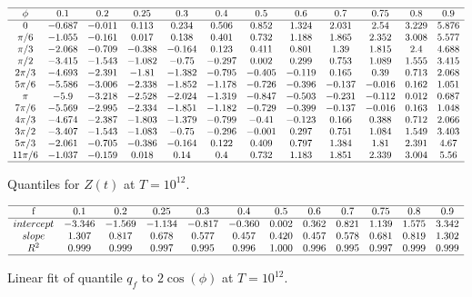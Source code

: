 \documentclass[twoside]{article}
\begin{document}
\begin{table}
\centering \(\begin{array}{cccccccccccc}
\hline
\phi&0.1&0.2&0.25&0.3&0.4&0.5&0.6&0.7&0.75&0.8&0.9 \\
\hline
0&-0.687&-0.011&0.113&0.234&0.506&0.852&1.324&2.031&2.54&3.229&5.876\\
\pi/6 &-1.055&-0.161&0.017&0.138&0.401&0.732&1.188&1.865&2.352&3.008&5.577\\
\pi/3 &-2.068&-0.709&-0.388&-0.164&0.123&0.411&0.801&1.39&1.815&2.4&4.688\\
\pi/2 &-3.415&-1.543&-1.082&-0.75&-0.297&0.002&0.299&0.753&1.089&1.555&3.415\\
2\pi/3 &-4.693&-2.391&-1.81&-1.382&-0.795&-0.405&-0.119&0.165&0.39&0.713&2.068\\
5\pi/6 &-5.586&-3.006&-2.338&-1.852&-1.178&-0.726&-0.396&-0.137&-0.016&0.162&1.051\\
\pi &-5.9&-3.218&-2.528&-2.024&-1.319&-0.847&-0.503&-0.231&-0.112&0.012&0.687\\
7\pi/6 &-5.569&-2.995&-2.334&-1.851&-1.182&-0.729&-0.399&-0.137&-0.016&0.163&1.048\\
4\pi/3 &-4.674&-2.387&-1.803&-1.379&-0.799&-0.41&-0.123&0.166&0.388&0.712&2.066\\
3\pi/2 &-3.407&-1.543&-1.083&-0.75&-0.296&-0.001&0.297&0.751&1.084&1.549&3.403\\
5\pi/3 &-2.061&-0.705&-0.386&-0.164&0.122&0.409&0.797&1.384&1.81&2.391&4.67\\
11\pi/6 &-1.037&-0.159&0.018&0.14&0.4&0.732&1.183&1.851&2.339&3.004&5.56\\

\hline
\end{array}\)
\caption{Quantiles  for  $Z(t)$ at $T=10^{12}$.}
\label{tab:quantiles12}
\end{table}


\begin{table}
\centering \(\begin{array}{cccccccccccc}
\hline
$f$&0.1&0.2&0.25&0.3&0.4&0.5&0.6&0.7&0.75&0.8&0.9\\
\hline
intercept&-3.346&-1.569&-1.134&-0.817&-0.360&0.002&0.362&0.821&1.139&1.575&3.342\\
slope&1.307&0.817&0.678&0.577&0.457&0.420&0.457&0.578&0.681&0.819&1.302\\
R^2&0.999&0.999&0.997&0.995&0.996&1.000&0.996&0.995&0.997&0.999&0.999\\
\hline
\end{array}\)
\caption{Linear fit of quantile $q_f$ to $2\cos(\phi)$ at $T=10^{12}$.}
\label{tab:fit12}
\end{table}
\end{document}
